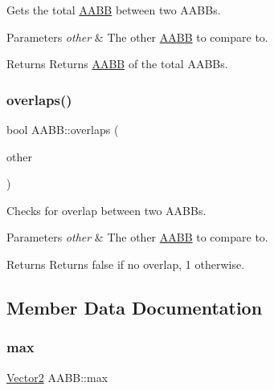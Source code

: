 Gets the total \mbox{\hyperlink{class_a_a_b_b}{A\+A\+BB}} between two A\+A\+B\+Bs. 


\begin{DoxyParams}{Parameters}
{\em other} & The other \mbox{\hyperlink{class_a_a_b_b}{A\+A\+BB}} to compare to. \\
\hline
\end{DoxyParams}
\begin{DoxyReturn}{Returns}
Returns \mbox{\hyperlink{class_a_a_b_b}{A\+A\+BB}} of the total A\+A\+B\+Bs. 
\end{DoxyReturn}
\mbox{\label{class_a_a_b_b_a28f0730e24e311de17180e3e42bc8d3d}} 
\subsubsection{\texorpdfstring{overlaps()}{overlaps()}}
{\footnotesize\ttfamily bool A\+A\+B\+B\+::overlaps (\begin{DoxyParamCaption}\item[{\mbox{\hyperlink{class_a_a_b_b}{A\+A\+BB}} \&}]{other }\end{DoxyParamCaption})}



Checks for overlap between two A\+A\+B\+Bs. 


\begin{DoxyParams}{Parameters}
{\em other} & The other \mbox{\hyperlink{class_a_a_b_b}{A\+A\+BB}} to compare to. \\
\hline
\end{DoxyParams}
\begin{DoxyReturn}{Returns}
Returns false if no overlap, 1 otherwise. 
\end{DoxyReturn}


\subsection{Member Data Documentation}
\mbox{\label{class_a_a_b_b_ad14f0a02aba39bcba965b15524921401}} 
\subsubsection{\texorpdfstring{max}{max}}
{\footnotesize\ttfamily \mbox{\hyperlink{struct_vector2}{Vector2}} A\+A\+B\+B\+::max}

